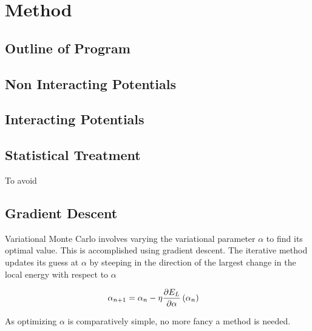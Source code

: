 \section{Method}\label{sec:Method}
\subsection{Outline of Program}
\subsection{Non Interacting Potentials}
\subsection{Interacting Potentials}

\subsection{Statistical Treatment}
To avoid 

\subsection{Gradient Descent}
Variational Monte Carlo involves varying the variational parameter \(\alpha\)
to find its optimal value. This is accomplished using gradient descent. The
iterative method updates its guess at \(\alpha\) by steeping in the direction of
the largest change in the local energy with respect to \(\alpha\)

\begin{align*}
  \alpha_{n+1} &= \alpha_{n} - \eta\pdv{E_{L}}{\alpha}\left( \alpha_{n} \right)
\end{align*}

As optimizing \(\alpha\) is comparatively simple, no more fancy a method is needed.